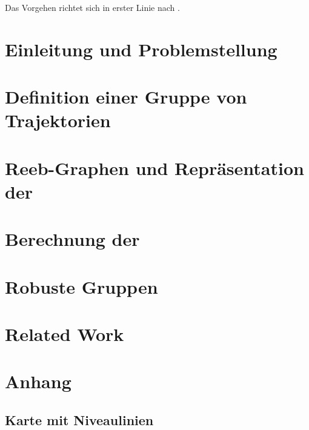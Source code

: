 




\tableofcontents

Das Vorgehen richtet sich in erster Linie nach \textcite{buchin2015}.
\cleardoubleoddemptypage
{}
\setcounter{page}{1}
\setcounter{footnote}{0}

\chapter{Einleitung und Problemstellung} %
\label{cha:einleitung}


\chapter{Definition einer Gruppe von Trajektorien} %
\label{cha:def_gruppe}


\chapter{Reeb-Graphen und Repräsentation der \GrpStruktur} %
\label{cha:reeb_graphen}


\chapter{Berechnung der \GrpStruktur} %
\label{cha:berechnung}


\chapter{Robuste Gruppen} %
\label{cha:robust}


\chapter{Related Work} %
\label{cha:related_work}







\cleardoubleoddemptypage
{}
\setcounter{page}{1}
\appendix
\chapter{Anhang} %
\label{cha:anhang}
\section{Karte mit Niveaulinien} %
\label{sec:karte_niveau}

\printindex
\listoffigures
\printbibliography
\todototoc
{}
